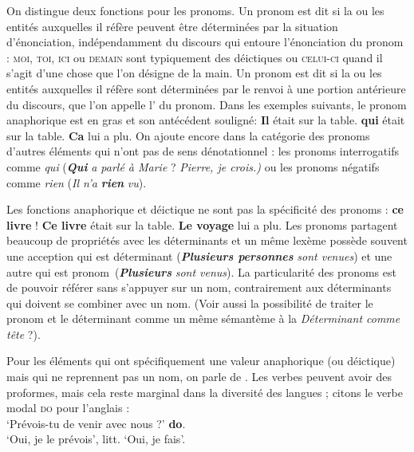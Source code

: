 {    On distingue deux fonctions pour les pronoms. Un pronom est dit  si la ou les entités auxquelles il réfère peuvent être déterminées par la situation d’énonciation, indépendamment du discours qui entoure l’énonciation du pronom : \textsc{moi,} \textsc{toi,} \textsc{ici} ou \textsc{demain} sont typiquement des déictiques ou \textsc{celui-ci} quand il s’agit d’une chose que l’on désigne de la main. Un pronom est dit  si la ou les entités auxquelles il réfère sont déterminées par le renvoi à une portion antérieure du discours, que l’on appelle l’\textstyleTermes{} du pronom. Dans les exemples suivants, le pronom anaphorique est en gras et son antécédent souligné:
\ea
   \textbf{{Il}}  {était sur la table.}
   \textbf{{qui}}  {était sur la table.}
   \textbf{{Ca}} {lui a plu.}
  \z
\z
    On ajoute encore dans la catégorie des pronoms d’autres éléments qui n’ont pas de sens dénotationnel : les pronoms interrogatifs comme \textit{qui} (\textbf{\textit{Qui}} \textit{a parlé à Marie} ? \textit{Pierre, je crois.)} ou les pronoms négatifs comme \textit{rien} (\textit{Il n’a} \textbf{\textit{rien}} \textit{vu}).\textbf{ }

    Les fonctions anaphorique et déictique ne sont pas la spécificité des pronoms :
\ea
   \textbf{{ce livre}} !
   \textbf{{Ce livre}}  {était sur la table.}
   \textbf{{Le voyage}}  {lui a plu.}
  \z
\z
    Les pronoms partagent beaucoup de propriétés avec les déterminants et un même lexème possède souvent une acception qui est déterminant (\textbf{\textit{Plusieurs personnes}} \textit{sont venues}) et une autre qui est pronom~(\textbf{\textit{Plusieurs}} \textit{sont venus}). La particularité des pronoms est de pouvoir référer sans s’appuyer sur un nom, contrairement aux déterminants qui doivent se combiner avec un nom. (Voir aussi la possibilité de traiter le pronom et le déterminant comme un même sémantème à la  \textit{Déterminant comme tête} ?).

    Pour les éléments qui ont spécifiquement une valeur anaphorique (ou déictique) mais qui ne reprennent pas un nom, on parle de . Les verbes peuvent avoir des proformes, mais cela reste marginal dans la diversité des langues ; citons le verbe modal \textsc{do} pour l’anglais :
\ea
  \\
  \glt   ‘Prévois-tu de venir avec nous ?’
   \textbf{{do}}.\\
  \glt   ‘Oui, je le prévois’, litt. ‘Oui, je fais’.
  \z
\z
}
